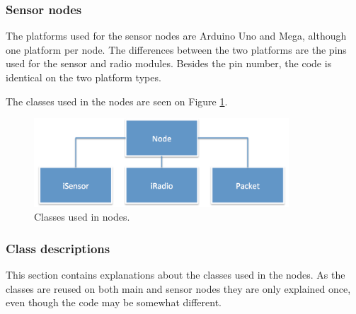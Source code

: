 \subsubsection*{Sensor nodes}
The platforms used for the sensor nodes are Arduino Uno and Mega, although one platform per node. The differences between the two platforms are the pins used for the sensor and radio modules. Besides the pin number, the code is identical on the two platform types. 

The classes used in the nodes are seen on Figure \ref{fig:nodeClass}.
\begin{figure}[h!]
\centering
\includegraphics[width=0.85\textwidth]{chapters/implementation/figures/nodeClass.png}
\caption{Classes used in nodes.}
\label{fig:nodeClass}
\end{figure}


\subsubsection*{Class descriptions}
This section contains explanations about the classes used in the nodes. As the classes are reused on both main and sensor nodes they are only explained once, even though the code may be somewhat different.

